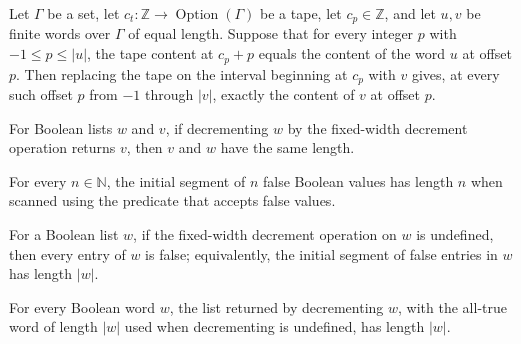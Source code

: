 \begin{theorem}
\label{Turing.sc_wordPatch_frame}
\leanok
{}
Let $\Gamma$ be a set, let $c_t:\mathbb{Z}\to\operatorname{Option}(\Gamma)$ be a tape,
let $c_p\in\mathbb{Z}$, and let $u,v$ be finite words over $\Gamma$ of equal length.
Suppose that for every integer $p$ with $-1\le p\le |u|$, the tape content at $c_p+p$
equals the content of the word $u$ at offset $p$. Then replacing the tape on the
interval beginning at $c_p$ with $v$ gives, at every such offset $p$ from $-1$ through
$|v|$, exactly the content of $v$ at offset $p$.
\end{theorem}

\begin{theorem}
\label{Turing.sc_dec_success_width}
\leanok
{}
For Boolean lists $w$ and $v$, if decrementing $w$ by the fixed-width decrement
operation returns $v$, then $v$ and $w$ have the same length.
\end{theorem}

\begin{theorem}
\label{Turing.sc_takeWhile_replicate}
\leanok
{}
For every $n\in\mathbb N$, the initial segment of $n$ false Boolean values has length
$n$ when scanned using the predicate that accepts false values.
\end{theorem}

\begin{theorem}
\label{Turing.sc_dec_underflow_cost}
\leanok
{}
For a Boolean list $w$, if the fixed-width decrement operation on $w$ is undefined, then
every entry of $w$ is false; equivalently, the initial segment of false entries in $w$
has length $|w|$.
\end{theorem}

\begin{theorem}
\label{Turing.sc_dec_patch_width}
\leanok
{}
For every Boolean word $w$, the list returned by decrementing $w$, with the all-true
word of length $|w|$ used when decrementing is undefined, has length $|w|$.
\end{theorem}

